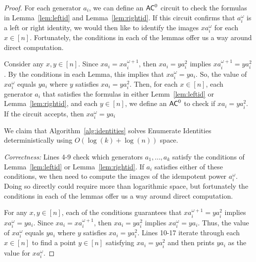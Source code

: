 \documentclass[10pt,a4paper]{amsart}
\newcommand{\AC}{\ensuremath\mathsf{AC}}
\begin{document}
\begin{proof}
For each generator $a_i$, we can define an $\AC^0$ circuit to check the formulas in Lemma~\ref{lem:leftid} and Lemma~\ref{lem:rightid}. If this circuit confirms that $a_i^\omega$ is a left or right identity, we would then like to identify the images $xa_i^\omega$ for each $x \in [n]$. Fortunately, the conditions in each of the lemmas offer us a way around direct computation.

Consider any $x,y \in [n]$. Since $xa_i = xa_i^{\omega+1}$, then $xa_i = ya_i^2$ implies $xa_i^{\omega+1} = ya_i^2$. By the conditions in each Lemma, this implies that $xa_i^\omega = ya_i$. So, the value of $xa_i^\omega$ equals $ya_i$ where $y$ satisfies $xa_i = ya_i^2$. Then, for each $x \in [n]$, each generator $a_i$ that satisfies the formulas in either Lemm~\ref{lem:leftid} or Lemma~\ref{lem:rightid}, and each $y \in [n]$, we define an $\AC^0$ to check if $xa_i = ya_i^2$. If the circuit accepts, then $xa_i^\omega = ya_i$

\iffalse
We claim that Algorithm~\ref{alg:identities} solves Enumerate Identities deterministically using $O(\log(k)+\log(n))$ space.

\emph{Correctness:} Lines 4-9 check which generators $a_1,\dots,a_k$ satisfy the conditions of Lemma~\ref{lem:leftid} or Lemma~\ref{lem:rightid}. If $a_i$ satisfies either of these conditions, we then need to compute the images of the idempotent power $a_i^\omega$. Doing so directly could require more than logarithmic space, but fortunately the conditions in each of the lemmas offer us a way around direct computation.

For any $x,y \in [n]$, each of the conditions guarantees that $xa_i^{\omega+1} = y a_i^2$ implies $xa_i^\omega = ya_i$. Since $xa_i = xa_i^{\omega+1}$, then $xa_i = ya_i^2$ implies $xa_i^\omega = ya_i$. Thus, the value of $xa_i^\omega$ equals $ya_i$ where $y$ satisfies $xa_i = ya_i^2$. Lines 10-17 iterate through each $x \in [n]$ to find a point $y \in [n]$ satisfying $xa_i = ya_i^2$ and then prints $ya_i$ as the value for $xa_i^\omega$.


\end{proof}
\end{document}
